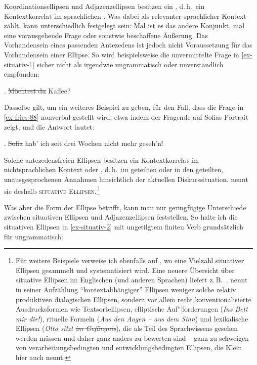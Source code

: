 Koordinationsellipsen und Adjazenzellipsen besitzen ein , d.\,h.\ ein Kontextkorrelat im sprachlichen . Was dabei als relevanter sprachlicher Kontext zählt, kann unterschiedlich festgelegt sein: Mal ist es das andere Konjunkt, mal eine vorausgehende Frage oder sonstwie beschaffene Äu\ss erung. Das Vorhandensein eines passenden Antezedens ist jedoch nicht Voraussetzung für das Vorhandensein einer Ellipse. So wird beispielsweise die unvermittelte Frage in \ref{ex-situativ-1} sicher nicht als irgendwie ungrammatisch oder unverständlich empfunden:

\ex. \label{ex-situativ-1} \sout{Möchtest du} Kaffee?

Dasselbe gilt, um ein weiteres Beispiel zu geben, für den Fall, dass die Frage in \ref{ex-fries-88} nonverbal gestellt wird, etwa indem der Fragende auf Sofias Portrait zeigt, und die Antwort lautet:

\ex. \label{ex-fries-88-2}\sout{Sofia} hab' ich seit drei Wochen nicht mehr geseh'n!

Solche antezedensfreien Ellipsen besitzen ein Kontextkorrelat im nichtsprachlichen Kontext oder , d.\,h.\ im geteilten  oder in den geteilten, unausgesprochenen Annahmen hinsichtlich der aktuellen Diskurssituation. \cite{Schwabe:94} nennt sie deshalb \textsc{situative Ellipsen}.\footnote{Für weitere Beispiele verweise ich ebenfalls auf \cite{Schwabe:94}, wo eine Vielzahl situativer Ellipsen gesammelt und systematisiert wird. Eine neuere Übersicht über situative Ellipsen im Englischen (und anderen Sprachen) liefert z.\,B.\ \cite{Merchant:04}. \citet[767]{Klein:93} nennt in seiner Aufzählung "`kontextabhängiger"' Ellipsen weniger solche relativ produktiven dialogischen Ellipsen, sondern vor allem recht konventionalisierte Ausdrucksformen wie Textsortellipsen, elliptische Auf"|forderungen ({\it Ins Bett mir dir!}), rituelle Formeln ({\it Aus den Augen -- aus dem Sinn}) und lexikalische Ellipsen ({\it Otto sitzt \sout{im Gefängnis}}), die als Teil des Sprachwissens gesehen werden müssen und daher ganz anders zu bewerten sind -- ganz zu schweigen von verarbeitungsbedingten und entwicklungsbedingten Ellipsen, die Klein hier auch nennt.} 

Was aber die Form der Ellipse betrifft, kann man nur geringfügige Unterschiede zwischen situativen Ellipsen und Adjazenzellipsen feststellen. So halte ich die situativen Ellipsen in \ref{ex-situativ-2} mit ungetilgtem finiten Verb grundsätzlich für ungrammatisch:

